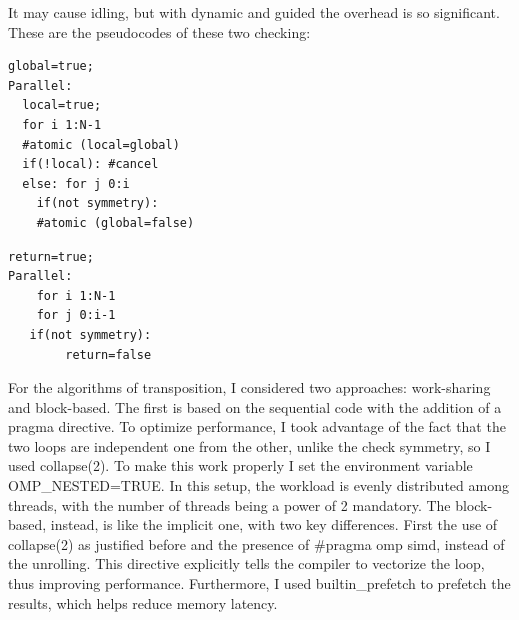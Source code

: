 It may cause idling, but with dynamic and guided the overhead is so significant. These are the pseudocodes of these two checking:
\begin{minipage}[t]{0.5\columnwidth} 
\begin{lstlisting}[style=Cstyle, caption={Exit in Advance}]
global=true;
Parallel:
  local=true;
  for i 1:N-1
  #atomic (local=global)
  if(!local): #cancel
  else: for j 0:i
    if(not symmetry):
    #atomic (global=false)
\end{lstlisting}
\end{minipage}\hfill
\begin{minipage}[t]{0.5\columnwidth}
\begin{lstlisting}[style=Cstyle, caption={All iterations}]
return=true;
Parallel:
    for i 1:N-1
    for j 0:i-1
   if(not symmetry):
        return=false
\end{lstlisting}
\end{minipage}
For the algorithms of transposition, I considered two approaches: work-sharing and block-based. The first is based on the sequential code with the addition of a pragma directive. To optimize performance, I took advantage of the fact that the two loops are independent one from the other, unlike the check symmetry, so I used collapse(2). To make this work properly I set the environment variable OMP\_NESTED=TRUE. In this setup, the workload is evenly distributed among threads, with the number of threads being a power of 2 mandatory. The block-based, instead, is like the implicit one, with two key differences. First the use of collapse(2) as justified before and the presence of $\#$pragma omp simd, instead of the unrolling. This directive explicitly tells the compiler to vectorize the loop, thus improving performance. Furthermore, I used builtin\_prefetch to prefetch the results, which helps reduce memory latency.
